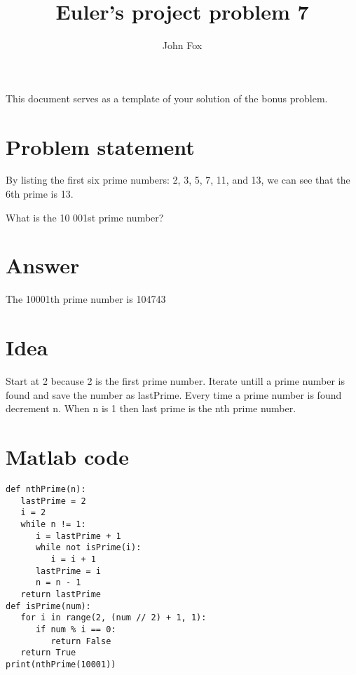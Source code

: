 \documentclass{article}
\title{Euler's project problem 7}
\author{John Fox}
\begin{document}
\maketitle
\large
This document serves as a template of your solution of the bonus problem.\\

\section*{Problem statement} 
By listing the first six prime numbers: 2, 3, 5, 7, 11, and 13, we can see that the 6th prime is 13.

What is the 10 001st prime number?

\section*{Answer}
The 10001th prime number is 104743
\section*{Idea} Start at 2 because 2 is the first prime number. Iterate untill a prime number is found and save the number as lastPrime. Every time a prime number is found decrement n. When n is 1 then last prime is the nth prime number. 

\section*{Matlab code}
\begin{verbatim}
def nthPrime(n):
   lastPrime = 2
   i = 2
   while n != 1:
      i = lastPrime + 1
      while not isPrime(i):
         i = i + 1
      lastPrime = i
      n = n - 1
   return lastPrime
def isPrime(num):
   for i in range(2, (num // 2) + 1, 1):
      if num % i == 0:
         return False
   return True
print(nthPrime(10001))
\end{verbatim}
\end{document}

